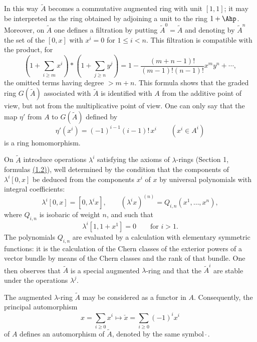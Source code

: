 In this way $\widetilde A$ becomes a commutative augmented ring with unit $[1,1]$; it may be interpreted as the ring obtained by adjoining a unit to the ring $1+\Ahp$. Moreover, on $\widetilde A$ one defines a filtration by putting $\widetilde A^0=\widetilde A$ and denoting by $\widetilde A^n$ the set of the $[0,x]$ with $x^i=0$ for $1\leq i<n$. This filtration is compatible with the product, for
\begin{equation}\tag{1.18}
\left(1+\sum_{i\geq m}x^i\right)*\left(1+\sum_{j\geq n}y^j\right)
=1-\frac{(m+n-1)!}{(m-1)!(n-1)!}x^m y^n+\cdots,
\end{equation}
the omitted terms having degree $>m+n$. This formula shows that the graded ring $G(\widetilde A)$ associated with $\widetilde A$ is identified with $A$ from the additive point of view, but not from the multiplicative point of view. One can only say that the map $\eta'$ from $A$ to $G(\widetilde A)$ defined by
\begin{equation}\tag{1.19}
\eta'(x^i)=(-1)^{i-1}(i-1)!\,x^i\qquad (x^i\in A^i)
\end{equation}
is a ring homomorphism.

On $\widetilde A$ introduce operations $\lambda^i$ satisfying the axioms of $\lambda$-rings (Section 1, formulas \hyperlink{sga6.e00.prop.1-2}{(1.2)}), well determined by the condition that the components of $\lambda^i[0,x]$ be deduced from the components $x^i$ of $x$ by universal polynomials with integral coefficients:
\begin{equation}\tag{1.20}
\lambda^i[0,x]=[0,\lambda^i x],\qquad (\lambda^i x)^{(n)}=Q_{i,n}(x^1,\ldots,x^n),
\end{equation}
where $Q_{i,n}$ is isobaric of weight $n$, and such that
\begin{equation}\tag{1.21}
\lambda^i[1,1+x^1]=0\qquad\text{for }i>1.
\end{equation}
The polynomials $Q_{i,n}$ are evaluated by a calculation with elementary symmetric functions: it is the calculation of the Chern classes of the exterior powers of a vector bundle by means of the Chern classes and the rank of that bundle. One then observes that $\widetilde A$ is a special augmented $\lambda$-ring and that the $\widetilde A^i$ are stable under the operations $\lambda^j$.

The augmented $\lambda$-ring $\widetilde A$ may be considered as a functor in $A$. Consequently, the principal automorphism
\[
x=\sum_{i\geq 0}x^i\longmapsto \check x=\sum_{i\geq 0}(-1)^i x^i
\]
of $A$ defines an automorphism of $\widetilde A$, denoted by the same symbol $\check{\ }$.

